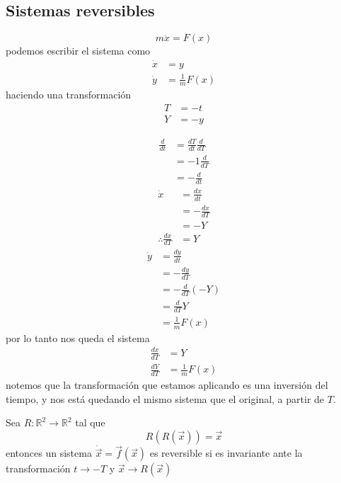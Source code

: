 \subsection{Sistemas reversibles}
\begin{equation*}
  m \ddot{x} = F(x) 
  \end{equation*} 
  podemos escribir el sistema como
  \begin{align*}
    \dot{x} &= y \\
    \dot{y} &= \frac{1}{m} F(x)
  \end{align*}       
haciendo una transformación
\begin{align*}
  T &= -t \\
  Y &= -y
\end{align*}

\begin{align*}
  \frac{d}{dt} &= \frac{dT}{dt} \frac{d}{dT} \\
  &= -1 \frac{d}{dT} \\
  &= -\frac{d}{dt}
\end{align*}
\begin{align*}
  \dot{x} &= \frac{dx}{dt} \\
  &= -\frac{dx}{dT} \\
  &= -Y \\ 
  \therefore \frac{dx}{dT} &= Y
\end{align*}
\begin{align*}
  \dot{y} &= \frac{dy}{dt} \\
          &= -\frac{dy}{dT} \\
          &= -\frac{d}{dT}(-Y) \\
          &= \frac{d}{dT}Y \\
          &= \frac{1}{m} F(x)
\end{align*}
por lo tanto nos queda el sistema
  \begin{align*}
    \frac{dx}{dT} &= Y \\
    \frac{dY}{dT}&= \frac{1}{m} F(x) 
  \end{align*}
  notemos que la transformación que estamos aplicando es una inversión del tiempo, y nos está quedando el mismo sistema que el original, a partir de $T$.
\begin{tcolorbox}[colback=Black!4, colframe=White,arc=2mm]
\begin{definicion} Sea $R: \mathbb{R}^2 \to \mathbb{R}^2$ tal que \begin{equation*}
  R(R(\vec{x}))=\vec{x} 
\end{equation*}
entonces un sistema $\dot{\vec{x}} = \vec{f}(\vec{x})$ es reversible si es invariante ante la transformación $t \to -T$ y $\vec{x} \to R(\vec{x})$
  
\end{definicion}
\end{tcolorbox}

